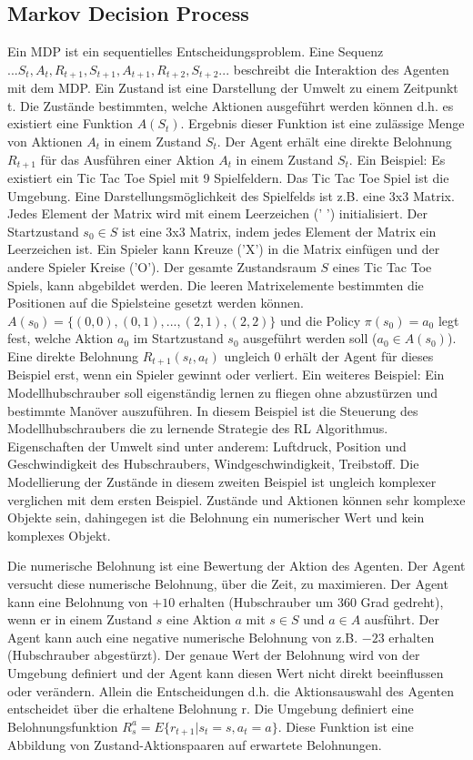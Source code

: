 \documentclass[conference]{IEEEtran}
\begin{document}
\subsection{Markov Decision Process}
Ein MDP ist ein sequentielles Entscheidungsproblem. Eine Sequenz $... S_t, A_t, R_{t+1}, S_{t+1}, A_{t+1}, R_{t+2}, S_{t+2} ...$ beschreibt die Interaktion des Agenten mit dem MDP. Ein Zustand ist eine Darstellung der Umwelt zu einem Zeitpunkt t. Die Zustände bestimmten, welche Aktionen ausgeführt werden können d.h. es existiert eine Funktion $A(S_t)$. Ergebnis dieser Funktion ist eine zulässige Menge von Aktionen $A_t$ in einem Zustand $S_t$. Der Agent erhält eine direkte Belohnung $R_{t+1}$ für das Ausführen einer Aktion $A_t$ in einem Zustand $S_t$. Ein Beispiel: Es existiert ein Tic Tac Toe Spiel mit 9 Spielfeldern. Das Tic Tac Toe Spiel ist die Umgebung. Eine Darstellungsmöglichkeit des Spielfelds ist z.B. eine 3x3 Matrix. Jedes Element der Matrix wird mit einem Leerzeichen (' ') initialisiert. Der Startzustand $s_0 \in S$ ist eine 3x3 Matrix, indem jedes Element der Matrix ein Leerzeichen ist. Ein Spieler kann Kreuze ('X') in die Matrix einfügen und der andere Spieler Kreise ('O'). Der gesamte Zustandsraum $S$ eines Tic Tac Toe Spiels, kann abgebildet werden. Die leeren Matrixelemente bestimmten die Positionen auf die Spielsteine gesetzt werden können. $A(s_0) = \{ (0,0), (0,1), ... , (2,1), (2,2)\}$ und die Policy $\pi(s_0) = a_0$ legt fest, welche Aktion $a_0$ im Startzustand $s_0$ ausgeführt werden soll ($a_0 \in A(s_0)$). Eine direkte Belohnung $R_{t+1}(s_t,a_t)$ ungleich $0$ erhält der Agent für dieses Beispiel erst, wenn ein Spieler gewinnt oder verliert. Ein weiteres Beispiel: Ein Modellhubschrauber soll eigenständig lernen zu fliegen ohne abzustürzen und bestimmte Manöver auszuführen. In diesem Beispiel ist die Steuerung des Modellhubschraubers die zu lernende Strategie des RL Algorithmus. Eigenschaften der Umwelt sind unter anderem: Luftdruck, Position und Geschwindigkeit des Hubschraubers, Windgeschwindigkeit, Treibstoff. Die Modellierung der Zustände in diesem zweiten Beispiel ist ungleich komplexer verglichen mit dem ersten Beispiel. Zustände und Aktionen können sehr komplexe Objekte sein, dahingegen ist die Belohnung ein numerischer Wert und kein komplexes Objekt.

Die numerische Belohnung ist eine Bewertung der Aktion des Agenten. Der Agent versucht diese numerische Belohnung, über die Zeit, zu maximieren. Der Agent kann eine Belohnung von $+10$ erhalten (Hubschrauber um 360 Grad gedreht), wenn er in einem Zustand $s$ eine Aktion $a$ mit $s\in S$ und $a\in A$ ausführt. Der Agent kann auch eine negative numerische Belohnung von z.B. $-23$ erhalten (Hubschrauber abgestürzt). Der genaue Wert der Belohnung wird von der Umgebung definiert und der Agent kann diesen Wert nicht direkt beeinflussen oder verändern. Allein die Entscheidungen d.h. die Aktionsauswahl des Agenten entscheidet über die erhaltene Belohnung r. Die Umgebung definiert eine Belohnungsfunktion $R_s^a = E\{ r_{t+1} | s_t = s, a_t = a \}$. Diese Funktion ist eine Abbildung von Zustand-Aktionspaaren auf erwartete Belohnungen.
\end{document}
